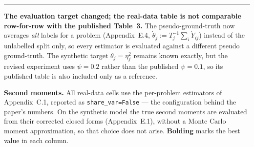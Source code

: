 \documentclass[11pt]{article}
\begin{document}
\vspace{0.4em}
\hrule
\vspace{0.5em}
{\scriptsize
\noindent\textbf{The evaluation target changed; the real-data table is not
comparable row-for-row with the published Table~3.} The pseudo-ground-truth now
averages \emph{all} labels for a problem (Appendix~E.4, $\dot\theta_j :=
T_j^{-1}\sum_i \dot Y_{ij}$) instead of the unlabelled split only, so every
estimator is evaluated against a different pseudo ground-truth. The synthetic
target $\theta_j = \eta_j^2$ remains known exactly, but the revised experiment
uses $\psi=0.2$ rather than the published $\psi=0.1$, so its published table is
also included only as a reference.

\noindent\textbf{Second moments.} All real-data cells use the per-problem
estimators of Appendix~C.1, reported as \texttt{share\_var=False} --- the
configuration behind the paper's numbers. On the synthetic model the true
second moments are evaluated from their corrected closed forms (Appendix~E.1),
without a Monte Carlo moment approximation, so that choice does not arise.
\textbf{Bolding} marks the best value in each column.
}
\end{document}
